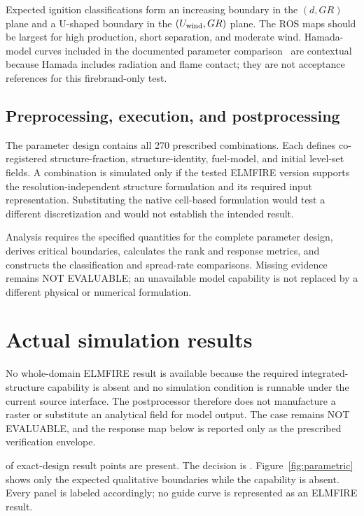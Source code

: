Expected ignition classifications form an increasing boundary in the
\((d,GR)\) plane and a U-shaped boundary in the
\((U_{\rm wind},GR)\) plane. The ROS maps should be largest for high
production, short separation, and moderate wind. Hamada-model curves included
in the documented parameter comparison~\cite{Qin2025,QinEtAl2026} are
contextual because Hamada includes radiation and flame contact; they are not
acceptance references for this firebrand-only test.

\subsection{Preprocessing, execution, and postprocessing}

The parameter design contains all 270 prescribed combinations. Each defines
co-registered structure-fraction, structure-identity, fuel-model, and initial
level-set fields. A combination is simulated only if the tested ELMFIRE version
supports the resolution-independent structure formulation and its required
input representation. Substituting the native cell-based formulation would
test a different discretization and would not establish the intended result.

Analysis requires the specified quantities for the complete parameter design,
derives critical boundaries, calculates the rank and response metrics, and
constructs the classification and spread-rate comparisons. Missing evidence
remains NOT EVALUABLE; an unavailable model capability is not replaced by a
different physical or numerical formulation.

\section{Actual simulation results}

No whole-domain ELMFIRE result is available because the required integrated-structure
capability is absent and no simulation condition is runnable under the current source interface.
The postprocessor therefore does not manufacture a raster or substitute an analytical
field for model output.  The case remains NOT EVALUABLE, and the response map below is
reported only as the prescribed verification envelope.

\CompletedVariantCount{} of \RequestedVariantCount{} exact-design result
points are present. The decision is \textbf{\OverallStatus}. Figure~\ref{fig:parametric}
shows only the expected qualitative boundaries while the capability is absent.
Every panel is labeled accordingly; no guide curve is represented as an
ELMFIRE result.

